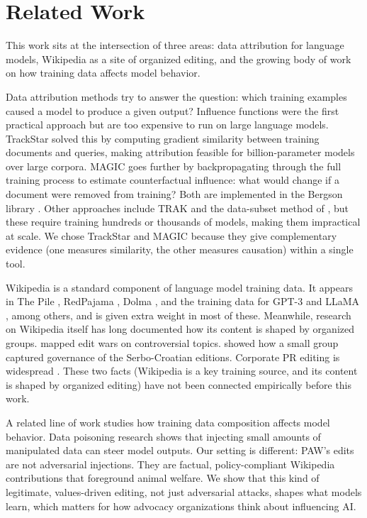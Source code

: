 \documentclass{article}
\begin{document}
\section{Related Work}

This work sits at the intersection of three areas: data attribution for language models, Wikipedia as a site of organized editing, and the growing body of work on how training data affects model behavior.

Data attribution methods try to answer the question: which training examples caused a model to produce a given output? Influence functions \citep{koh2017understanding} were the first practical approach but are too expensive to run on large language models. TrackStar \citep{chang2024scalable} solved this by computing gradient similarity between training documents and queries, making attribution feasible for billion-parameter models over large corpora. MAGIC \citep{ilyas2025magic} goes further by backpropagating through the full training process to estimate counterfactual influence: what would change if a document were removed from training? Both are implemented in the Bergson library \citep{lucia2026bergson}. Other approaches include TRAK \citep{park2023trak} and the data-subset method of \citet{ilyas2022datamodels}, but these require training hundreds or thousands of models, making them impractical at scale. We chose TrackStar and MAGIC because they give complementary evidence (one measures similarity, the other measures causation) within a single tool.

Wikipedia is a standard component of language model training data. It appears in The Pile \citep{gao2020pile}, RedPajama \citep{weber2024redpajama}, Dolma \citep{soldaini2024dolma}, and the training data for GPT-3 \citep{brown2020language} and LLaMA \citep{touvron2023llama}, among others, and is given extra weight in most of these. Meanwhile, research on Wikipedia itself has long documented how its content is shaped by organized groups. \citet{yasseri2012dynamics} mapped edit wars on controversial topics. \citet{kharazian2024governance} showed how a small group captured governance of the Serbo-Croatian editions. Corporate PR editing is widespread \citep{distaso2013}. These two facts (Wikipedia is a key training source, and its content is shaped by organized editing) have not been connected empirically before this work.

A related line of work studies how training data composition affects model behavior. Data poisoning research \citep{wallace2021concealed,carlini2023poisoning} shows that injecting small amounts of manipulated data can steer model outputs. Our setting is different: PAW's edits are not adversarial injections. They are factual, policy-compliant Wikipedia contributions that foreground animal welfare. We show that this kind of legitimate, values-driven editing, not just adversarial attacks, shapes what models learn, which matters for how advocacy organizations think about influencing AI.
\end{document}
